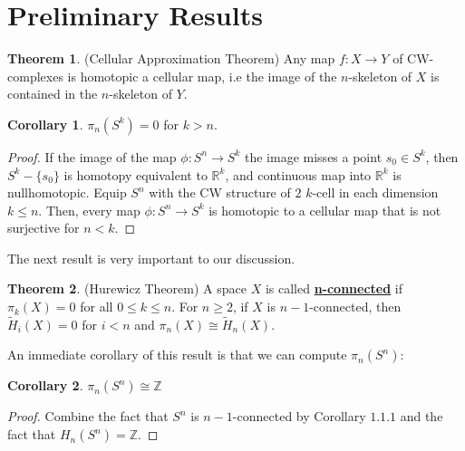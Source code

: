 \documentclass{article}
\theoremstyle{definition}
\newtheorem{theorem}{Theorem}[section]
\theoremstyle{definition}
\theoremstyle{definition}
\theoremstyle{definition}
\theoremstyle{definition}
\newtheorem{corollary}{Corollary}[theorem]
\theoremstyle{definition}
\begin{document}
\section{Preliminary Results}

\begin{tcolorbox}[colback=red!5!white,colframe=red!30!white]
\begin{theorem}
(Cellular Approximation Theorem) Any map $f: X\to Y$ of CW-complexes is homotopic a cellular map, i.e the image of the $n$-skeleton of $X$ is contained in the $n$-skeleton of $Y$.
\end{theorem}
\end{tcolorbox}

\begin{tcolorbox}[colback=green!5!white,colframe=green!30!white]
\begin{corollary}
$\pi_n(S^k)=0$ for $k>n$.
\end{corollary}
\end{tcolorbox}
\begin{proof}
    If the image of the map $\phi: S^n\to S^k$ the image misses a point $s_0\in S^k$, then $S^k-\{s_0\}$ is homotopy equivalent to $\mathbb{R}^{k}$, and continuous map into $\mathbb{R}^{k}$ is nullhomotopic. Equip $S^n$ with the CW structure of $2$ $k$-cell in each dimension $k\leq n$. Then, every map $\phi: S^n\to S^k$ is homotopic to a cellular map that is not surjective for $n<k$.
\end{proof}

The next result is very important to our discussion. 

\begin{tcolorbox}[colback=red!5!white,colframe=red!30!white]
\begin{theorem}
(Hurewicz Theorem) A space $X$ is called \underline{\textbf{n-connected}} if $\pi_k(X)=0$ for all $0\leq k\leq n$. For $n\geq 2$, if $X$ is $n-1$-connected, then $\tilde{H}_i(X)=0$ for $i<n$ and  $\pi_n(X)\cong \tilde{H}_n(X)$.
\end{theorem}
\end{tcolorbox}
An immediate corollary of this result is that we can compute $\pi_n(S^n)$:
\begin{tcolorbox}[colback=green!5!white,colframe=green!30!white]
\begin{corollary}
$\pi_n(S^n)\cong \mathbb{Z}$
\end{corollary}
\end{tcolorbox}
\begin{proof}
    Combine the fact that $S^n$ is $n-1$-connected by Corollary $1.1.1$ and the fact that $H_n(S^n)=\mathbb{Z}$.
\end{proof}
\end{document}
